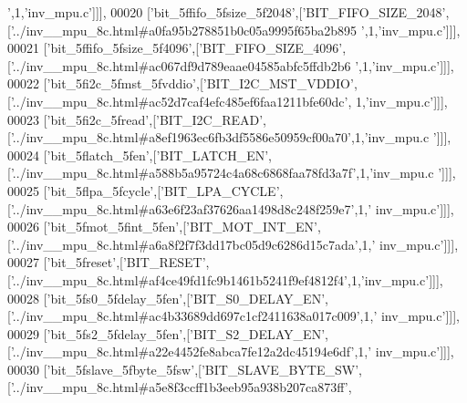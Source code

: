 \begin{DoxyCode}
{      '},1,\textcolor{stringliteral}{'inv\_mpu.c'}]]],
00020   [\textcolor{stringliteral}{'bit\_5ffifo\_5fsize\_5f2048'},[\textcolor{stringliteral}{'BIT\_FIFO\_SIZE\_2048'},[\textcolor{stringliteral}{'../inv\_\_mpu\_8c.html#a0fa95b278851b0c05a9995f65ba2b895
      '},1,\textcolor{stringliteral}{'inv\_mpu.c'}]]],
00021   [\textcolor{stringliteral}{'bit\_5ffifo\_5fsize\_5f4096'},[\textcolor{stringliteral}{'BIT\_FIFO\_SIZE\_4096'},[\textcolor{stringliteral}{'../inv\_\_mpu\_8c.html#ac067df9d789eaae04585abfc5ffdb2b6
      '},1,\textcolor{stringliteral}{'inv\_mpu.c'}]]],
00022   [\textcolor{stringliteral}{'bit\_5fi2c\_5fmst\_5fvddio'},[\textcolor{stringliteral}{'BIT\_I2C\_MST\_VDDIO'},[\textcolor{stringliteral}{'../inv\_\_mpu\_8c.html#ac52d7caf4efc485ef6faa1211bfe60dc'},
      1,\textcolor{stringliteral}{'inv\_mpu.c'}]]],
00023   [\textcolor{stringliteral}{'bit\_5fi2c\_5fread'},[\textcolor{stringliteral}{'BIT\_I2C\_READ'},[\textcolor{stringliteral}{'../inv\_\_mpu\_8c.html#a8ef1963ec6fb3df5586e50959cf00a70'},1,\textcolor{stringliteral}{'inv\_mpu.c
      '}]]],
00024   [\textcolor{stringliteral}{'bit\_5flatch\_5fen'},[\textcolor{stringliteral}{'BIT\_LATCH\_EN'},[\textcolor{stringliteral}{'../inv\_\_mpu\_8c.html#a588b5a95724c4a68c6868faa78fd3a7f'},1,\textcolor{stringliteral}{'inv\_mpu.c
      '}]]],
00025   [\textcolor{stringliteral}{'bit\_5flpa\_5fcycle'},[\textcolor{stringliteral}{'BIT\_LPA\_CYCLE'},[\textcolor{stringliteral}{'../inv\_\_mpu\_8c.html#a63e6f23af37626aa1498d8c248f259e7'},1,\textcolor{stringliteral}{'
      inv\_mpu.c'}]]],
00026   [\textcolor{stringliteral}{'bit\_5fmot\_5fint\_5fen'},[\textcolor{stringliteral}{'BIT\_MOT\_INT\_EN'},[\textcolor{stringliteral}{'../inv\_\_mpu\_8c.html#a6a8f2f7f3dd17bc05d9c6286d15c7ada'},1,\textcolor{stringliteral}{'
      inv\_mpu.c'}]]],
00027   [\textcolor{stringliteral}{'bit\_5freset'},[\textcolor{stringliteral}{'BIT\_RESET'},[\textcolor{stringliteral}{'../inv\_\_mpu\_8c.html#af4ce49fd1fc9b1461b5241f9ef4812f4'},1,\textcolor{stringliteral}{'inv\_mpu.c'}]]],
00028   [\textcolor{stringliteral}{'bit\_5fs0\_5fdelay\_5fen'},[\textcolor{stringliteral}{'BIT\_S0\_DELAY\_EN'},[\textcolor{stringliteral}{'../inv\_\_mpu\_8c.html#ac4b33689dd697c1cf2411638a017c009'},1,\textcolor{stringliteral}{'
      inv\_mpu.c'}]]],
00029   [\textcolor{stringliteral}{'bit\_5fs2\_5fdelay\_5fen'},[\textcolor{stringliteral}{'BIT\_S2\_DELAY\_EN'},[\textcolor{stringliteral}{'../inv\_\_mpu\_8c.html#a22e4452fe8abca7fe12a2dc45194e6df'},1,\textcolor{stringliteral}{'
      inv\_mpu.c'}]]],
00030   [\textcolor{stringliteral}{'bit\_5fslave\_5fbyte\_5fsw'},[\textcolor{stringliteral}{'BIT\_SLAVE\_BYTE\_SW'},[\textcolor{stringliteral}{'../inv\_\_mpu\_8c.html#a5e8f3ccff1b3eeb95a938b207ca873ff'},

\end{DoxyCode}
